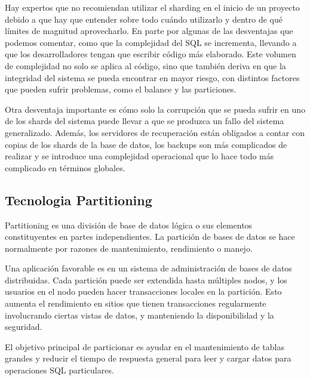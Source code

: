 \documentclass[twoside,twocolumn]{article}
\begin{document}
Hay expertos que no recomiendan utilizar el sharding en el inicio de un proyecto 
debido a que hay que entender sobre todo cuándo utilizarlo y dentro de qué límites
 de magnitud aprovecharlo. En parte por algunas de las desventajas que podemos 
 comentar, como que la complejidad del SQL se incrementa, llevando a que los 
 desarrolladores tengan que escribir código más elaborado. Este volumen de 
 complejidad no solo se aplica al código, sino que también deriva en que la 
 integridad del sistema se pueda encontrar en mayor riesgo, con distintos 
 factores que pueden sufrir problemas, como el balance y las particiones.

Otra desventaja importante es cómo solo la corrupción que se pueda sufrir 
en uno de los shards del sistema puede llevar a que se produzca un fallo del 
sistema generalizado. Además, los servidores de recuperación están obligados 
a contar con copias de los shards de la base de datos, los backups son más 
complicados de realizar y se introduce una complejidad operacional que lo hace
 todo más complicado en términos globales.
 \subsection{Tecnologia Partitioning}
 Partitioning es una división de base de datos lógica o sus elementos
  constituyentes en partes independientes. La partición de bases de datos
   se hace normalmente por razones de mantenimiento, rendimiento o manejo. 

Una aplicación favorable es en un sistema de administración de bases de datos 
distribuidas. Cada partición puede ser extendida hasta múltiples nodos, y los 
usuarios en el nodo pueden hacer transacciones locales en la partición. Esto 
aumenta el rendimiento en sitios que tienen transacciones regularmente 
involucrando ciertas vistas de datos, y manteniendo la disponibilidad y 
la seguridad. 

El objetivo principal de particionar es ayudar en el mantenimiento de 
tablas grandes y reducir el tiempo de respuesta general para leer y cargar
 datos para operaciones SQL particulares. 
\end{document}
